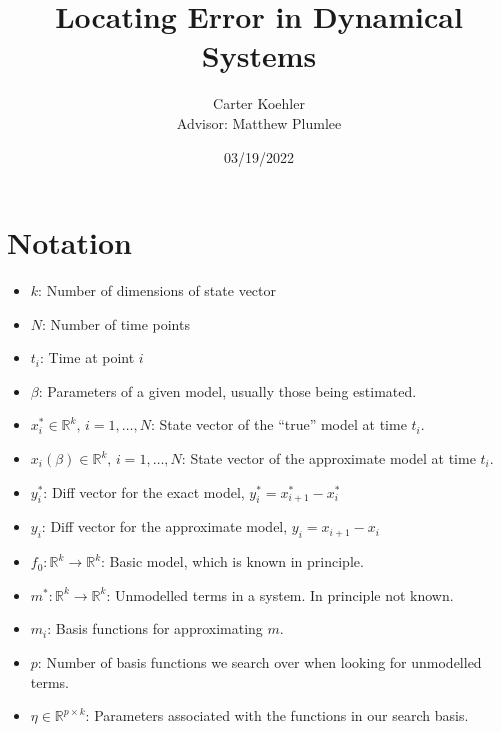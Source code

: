 \documentclass[12pt]{article}
\author{Carter Koehler\\{\small Advisor: Matthew Plumlee}}
\title{Locating Error in Dynamical Systems}
\date{03/19/2022}
\begin{document}
\maketitle



\begin{abstract}
  
\end{abstract}


\section{Notation}

\begin{itemize}

\item
  $k$: Number of dimensions of state vector

\item
  $N$: Number of time points

\item
  $t_i$: Time at point $i$

\item
  $\beta$: Parameters of a given model, usually those being estimated.
  
\item
  $x_i^* \in \mathbb{R}^k,\, i=1,\ldots, N$: State vector of the ``true'' model at time $t_i$. 

\item
  $x_i(\beta) \in \mathbb{R}^k,\, i=1,\ldots, N$: State vector of the approximate model at time $t_i$. 

\item
  $y_i^*$: Diff vector for the exact model, $y_i^* = x_{i+1}^* - x_i^*$
  
\item
  $y_i$: Diff vector for the approximate model, $y_i = x_{i+1} - x_i$

\item
  $f_0: \mathbb{R}^k \to \mathbb{R}^k$: Basic model, which is known in principle.

\item
  $m^*: \mathbb{R}^k \to \mathbb{R}^k$: Unmodelled terms in a system. In principle not known.

\item
  $m_i$: Basis functions for approximating $m$.
  
\item
  $p$: Number of basis functions we search over when looking for unmodelled terms.
  
\item
  $\eta \in \mathbb{R}^{p \times k}$: Parameters associated with the functions in our search basis.

\end{itemize}
\end{document}
